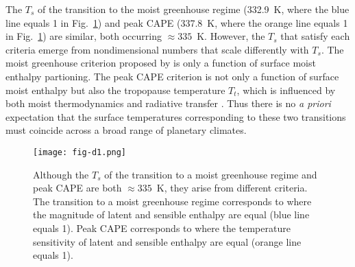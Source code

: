 \documentclass[draft,twocol]{ametsocV6.1}
\begin{document}
The $T_s$ of the transition to the moist greenhouse regime (332.9~K, where the blue line equals 1 in Fig.~\ref{fig:fig-d1}) and peak CAPE (337.8~K, where the orange line equals 1 in Fig.~\ref{fig:fig-d1}) are similar, both occurring $\approx335$~K. However, the $T_s$ that satisfy each criteria emerge from nondimensional numbers that scale differently with $T_s$. The moist greenhouse criterion proposed by \cite{wordsworth2013} is only a function of surface moist enthalpy partioning. The peak CAPE criterion is not only a function of surface moist enthalpy but also the tropopause temperature $T_t$, which is influenced by both moist thermodynamics and radiative transfer \citep[e.g.,][]{held1982, hu2019a}. Thus there is no \textit{a priori} expectation that the surface temperatures corresponding to these two transitions must coincide across a broad range of planetary climates.

\begin{figure}[htbp]
 \centering
 \texttt{[image: fig-d1.png]}
 \caption{Although the $T_s$ of the transition to a moist greenhouse regime and peak CAPE are both $\approx 335$~K, they arise from different criteria. The transition to a moist greenhouse regime corresponds to where the magnitude of latent and sensible enthalpy are equal (blue line equals 1). Peak CAPE corresponds to where the temperature sensitivity of latent and sensible enthalpy are equal (orange line equals 1).}\label{fig:fig-d1}
\end{figure}

\clearpage




\end{document}
